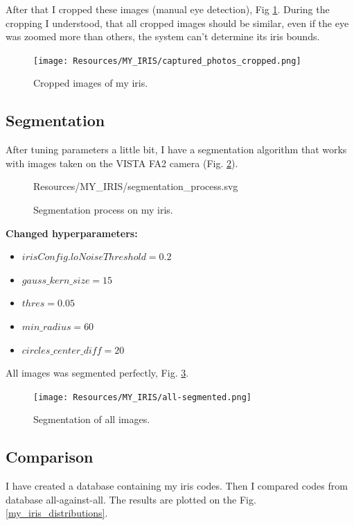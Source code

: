 \documentclass{article}
\begin{document}
After that I cropped these images (manual eye detection), Fig \ref{my_iris_captured_photos_cropped}.
During the cropping I understood, that all cropped images should be similar, even if the eye was zoomed more than others, the system can't determine its iris bounds.

\begin{figure}[ht!]
  \centering
  \texttt{[image: Resources/MY\_IRIS/captured\_photos\_cropped.png]}
  \caption{Cropped images of my iris.}
  \label{my_iris_captured_photos_cropped}
\end{figure}

\subsection{Segmentation}
After tuning parameters a little bit, I have a segmentation algorithm that works with images taken on the VISTA FA2 camera (Fig. \ref{my_iris_segmentation_process}).

\begin{figure}[ht!]
  \centering
  \def\svgscale{0.7}
   {Resources/MY_IRIS/segmentation_process.svg}
  \caption{Segmentation process on my iris.}
  \label{my_iris_segmentation_process}
\end{figure}

\newpage

\textbf{Changed hyperparameters:}
\begin{itemize}
  \item \(irisConfig.loNoiseThreshold = 0.2\)
  \item \(gauss\_kern\_size = 15\)
  \item \(thres = 0.05\)
  \item \(min\_radius = 60\)
  \item \(circles\_center\_diff = 20\)
\end{itemize}

\noindent All images was segmented perfectly, Fig. \ref{my_iris_all_segmented}.


\begin{figure}[ht!]
  \centering
  \texttt{[image: Resources/MY\_IRIS/all-segmented.png]}
  \caption{Segmentation of all images.}
  \label{my_iris_all_segmented}
\end{figure}

\subsection{Comparison}
I have created a database containing my iris codes.
Then I compared codes from database all-against-all.
The results are plotted on the Fig. \ref{my_iris_distributions}.
\end{document}
